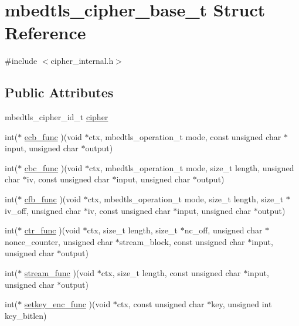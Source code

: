 \hypertarget{structmbedtls__cipher__base__t}{\section{mbedtls\-\_\-cipher\-\_\-base\-\_\-t Struct Reference}
\label{structmbedtls__cipher__base__t}
}


{\ttfamily \#include $<$cipher\-\_\-internal.\-h$>$}

\subsection*{Public Attributes}
\begin{DoxyCompactItemize}
\item 
mbedtls\-\_\-cipher\-\_\-id\-\_\-t \hyperlink{structmbedtls__cipher__base__t_a0c4c819c23b0a579445f92a4bee7d577}{cipher}
\item 
int($\ast$ \hyperlink{structmbedtls__cipher__base__t_a121420c2b88c1d6ae21381b83689994a}{ecb\-\_\-func} )(void $\ast$ctx, mbedtls\-\_\-operation\-\_\-t mode, const unsigned char $\ast$input, unsigned char $\ast$output)
\item 
int($\ast$ \hyperlink{structmbedtls__cipher__base__t_ae8660ce572a7631aff9d36088ed88f6d}{cbc\-\_\-func} )(void $\ast$ctx, mbedtls\-\_\-operation\-\_\-t mode, size\-\_\-t length, unsigned char $\ast$iv, const unsigned char $\ast$input, unsigned char $\ast$output)
\item 
int($\ast$ \hyperlink{structmbedtls__cipher__base__t_a3e6bf51180be5dbe94774e5d1418d8dc}{cfb\-\_\-func} )(void $\ast$ctx, mbedtls\-\_\-operation\-\_\-t mode, size\-\_\-t length, size\-\_\-t $\ast$iv\-\_\-off, unsigned char $\ast$iv, const unsigned char $\ast$input, unsigned char $\ast$output)
\item 
int($\ast$ \hyperlink{structmbedtls__cipher__base__t_aa80b801b6e776896bffb0869b01c1781}{ctr\-\_\-func} )(void $\ast$ctx, size\-\_\-t length, size\-\_\-t $\ast$nc\-\_\-off, unsigned char $\ast$nonce\-\_\-counter, unsigned char $\ast$stream\-\_\-block, const unsigned char $\ast$input, unsigned char $\ast$output)
\item 
int($\ast$ \hyperlink{structmbedtls__cipher__base__t_a78fcec085792ca33918b911a747a4b3f}{stream\-\_\-func} )(void $\ast$ctx, size\-\_\-t length, const unsigned char $\ast$input, unsigned char $\ast$output)
\item 
int($\ast$ \hyperlink{structmbedtls__cipher__base__t_a40976b94076be9ae19c01268ed61c7c7}{setkey\-\_\-enc\-\_\-func} )(void $\ast$ctx, const unsigned char $\ast$key, unsigned int key\-\_\-bitlen)

\end{DoxyCompactItemize}
